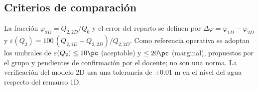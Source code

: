 \subsection{Criterios de comparación}\label{sec:sesgo}
La fracción $\varphi_{2D}=Q_{2,2D}/Q_{0}$ y el error del reparto se definen por $\Delta\varphi=\varphi_{1D}-\varphi_{2D}$ y $\varepsilon(Q_2)=100\,(Q_{2,1D}-Q_{2,2D})/Q_{2,2D}$. Como referencia operativa se adoptan los umbrales de $\varepsilon(Q_2)\leq10\pc$ (aceptable) y $\leq20\pc$ (marginal), propuestos por el grupo y pendientes de confirmación por el docente; no son una norma. La verificación del modelo 2D usa una tolerancia de $\pm0.01$ m en el nivel del agua respecto del remanso 1D.
